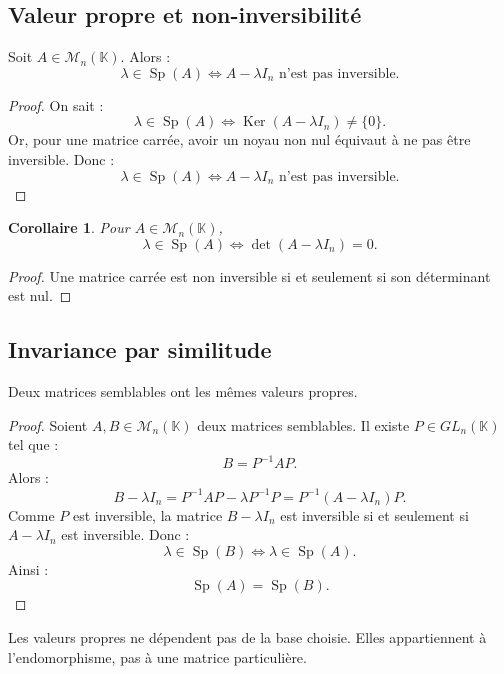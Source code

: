 \documentclass[11pt,a4paper]{article}
\newcommand{\K}{\mathbb K}
\newcommand{\M}{\mathcal M}
\newcommand{\Ker}{\operatorname{Ker}}
\newcommand{\Sp}{\operatorname{Sp}}
\newtheorem{corollaire}[prop]{Corollaire}
\begin{document}
\subsection{Valeur propre et non-inversibilité}

\begin{theorembox}
Soit \(A\in\M_n(\K)\).  
Alors :
\[
\lambda\in\Sp(A)
\Longleftrightarrow
A-\lambda I_n\text{ n'est pas inversible}.
\]
\end{theorembox}

\begin{proof}
On sait :
\[
\lambda\in\Sp(A)
\Longleftrightarrow
\Ker(A-\lambda I_n)\neq\{0\}.
\]
Or, pour une matrice carrée, avoir un noyau non nul équivaut à ne pas être inversible.  
Donc :
\[
\lambda\in\Sp(A)
\Longleftrightarrow
A-\lambda I_n\text{ n'est pas inversible}.
\]
\end{proof}

\begin{corollaire}
Pour \(A\in\M_n(\K)\),
\[
\lambda\in\Sp(A)
\Longleftrightarrow
\det(A-\lambda I_n)=0.
\]
\end{corollaire}

\begin{proof}
Une matrice carrée est non inversible si et seulement si son déterminant est nul.
\end{proof}

\subsection{Invariance par similitude}

\begin{theorembox}
Deux matrices semblables ont les mêmes valeurs propres.
\end{theorembox}

\begin{proof}
Soient \(A,B\in\M_n(\K)\) deux matrices semblables.  
Il existe \(P\in GL_n(\K)\) tel que :
\[
B=P^{-1}AP.
\]
Alors :
\[
B-\lambda I_n
=
P^{-1}AP-\lambda P^{-1}P
=
P^{-1}(A-\lambda I_n)P.
\]
Comme \(P\) est inversible, la matrice \(B-\lambda I_n\) est inversible si et seulement si \(A-\lambda I_n\) est inversible.  
Donc :
\[
\lambda\in\Sp(B)
\Longleftrightarrow
\lambda\in\Sp(A).
\]
Ainsi :
\[
\Sp(A)=\Sp(B).
\]
\end{proof}

\begin{retenirbox}
Les valeurs propres ne dépendent pas de la base choisie.  
Elles appartiennent à l'endomorphisme, pas à une matrice particulière.
\end{retenirbox}
\end{document}
